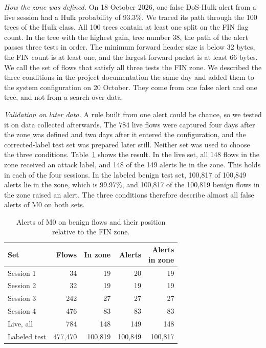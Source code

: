\documentclass[conference]{IEEEtran}
\begin{document}
\textit{How the zone was defined.} On 18 October 2026, one false DoS-Hulk alert from a live session had a Hulk probability of 93.3\%. We traced its path through the 100 trees of the Hulk class. All 100 trees contain at least one split on the FIN flag count. In the tree with the highest gain, tree number 38, the path of the alert passes three tests in order. The minimum forward header size is below 32 bytes, the FIN count is at least one, and the largest forward packet is at least 66 bytes. We call the set of flows that satisfy all three tests the FIN zone. We described the three conditions in the project documentation the same day and added them to the system configuration on 20 October. They come from one false alert and one tree, and not from a search over data.

\textit{Validation on later data.} A rule built from one alert could be chance, so we tested it on data collected afterwards. The 784 live flows were captured four days after the zone was defined and two days after it entered the configuration, and the corrected-label test set was prepared later still. Neither set was used to choose the three conditions. Table~\ref{tab:zone} shows the result. In the live set, all 148 flows in the zone received an attack label, and 148 of the 149 alerts lie in the zone. This holds in each of the four sessions. In the labeled benign test set, 100,817 of 100,849 alerts lie in the zone, which is 99.97\%, and 100,817 of the 100,819 benign flows in the zone raised an alert. The three conditions therefore describe almost all false alerts of M0 on both sets.

\begin{table}[t]
\caption{Alerts of M0 on benign flows and their position relative to the FIN zone.}
\label{tab:zone}
\centering
\footnotesize
\setlength{\tabcolsep}{3pt}
\begin{tabular}{lrrrr}
\toprule
Set & Flows & In zone & Alerts & \makecell[r]{Alerts\\in zone} \\
\midrule
Session 1 & 34 & 19 & 20 & 19 \\
Session 2 & 32 & 19 & 19 & 19 \\
Session 3 & 242 & 27 & 27 & 27 \\
Session 4 & 476 & 83 & 83 & 83 \\
Live, all & 784 & 148 & 149 & 148 \\
\midrule
Labeled test & 477,470 & 100,819 & 100,849 & 100,817 \\
\bottomrule
\end{tabular}
\end{table}
\end{document}
